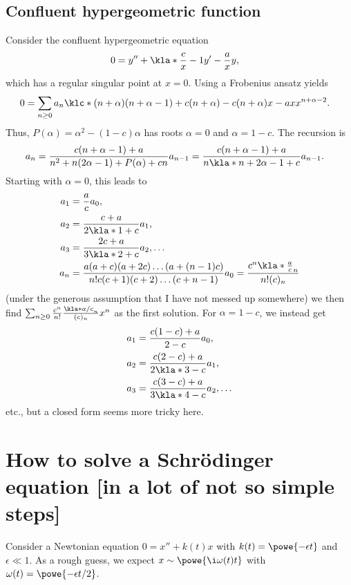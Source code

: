 \documentclass[english, parskip=full]{scrartcl}
\begin{document}
\subsection{Confluent hypergeometric function}
Consider the confluent hypergeometric equation
\begin{align}
0 &= y'' + \kla*{\frac{c}{x} - 1}y' - \frac{a}{x}y,
\end{align}
which has a regular singular point at $x=0$.
Using a Frobenius ansatz yields
\begin{align}
0 &= \sum_{n\ge 0} a_n \klc*{(n+\alpha)(n+\alpha-1) + c(n+\alpha) - c(n+\alpha)x - ax}x^{n+\alpha-2}.
\end{align}
Thus, $P(\alpha) = \alpha^2-(1-c)\alpha$ has roots $\alpha=0$ and $\alpha=1-c$.
The recursion is
\begin{align}
a_n &= \frac{c(n+\alpha-1) + a}{n^2 + n(2\alpha-1) + P(\alpha) + cn} a_{n-1} = \frac{c(n+\alpha-1) + a}{n\kla*{n + 2\alpha-1 + c}} a_{n-1}.
\end{align}
Starting with $\alpha=0$, this leads to
\begin{align}
a_1 &= \frac{a}{c} a_0,\\
a_2 &= \frac{c + a}{2\kla*{1 + c}} a_1,\\
a_3 &= \frac{2c + a}{3\kla*{2 + c}} a_2, \dots\\
a_n &= \frac{a(a+c)(a+2c)\dots (a+(n-1)c)}{n! c(c+1)(c+2)\dots (c+n-1)} a_0 = \frac{c^n \kla*{\frac{a}{c}}_n}{n! (c)_n}
\end{align}
(under the generous assumption that I have not messed up somewhere) we then find $\sum_{n\ge 0} \frac{c^n}{n!} \frac{\kla*{a/c}_n}{(c)_n} x^n$ as the first solution.
For $\alpha=1-c$, we instead get
\begin{align}
a_1 &= \frac{c(1-c) + a}{2 - c} a_0,\\
a_2 &= \frac{c(2-c) + a}{2\kla*{3 - c}} a_1,\\
a_3 &= \frac{c(3-c) + a}{3\kla*{4 - c}} a_2,\dots
\end{align}
etc., but a closed form seems more tricky here.
\section{How to solve a Schrödinger equation [in a lot of not so simple steps]}
Consider a Newtonian equation $0 = x'' + k(t)x$ with $k(t)=\powe{-\epsilon t}$ and $\epsilon\ll 1$.
As a rough guess, we expect $x\sim \powe{\i \omega(t)t}$ with $\omega(t) = \powe{-\epsilon t/2}$.
\end{document}
